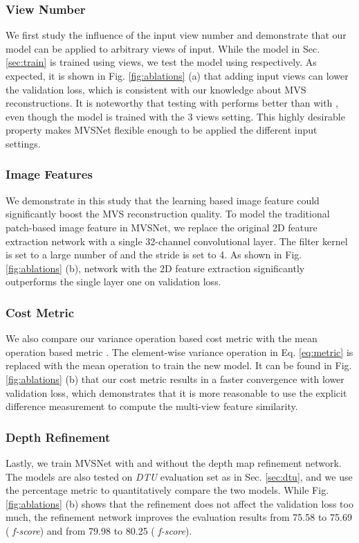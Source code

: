 \documentclass[runningheads]{llncs}
\begin{document}
\subsubsection{View Number}
We first study the influence of the input view number  and demonstrate that our model can be applied to arbitrary views of input. While the model in Sec. \ref{sec:train} is trained using  views, we test the model using  respectively. As expected, it is shown in Fig. \ref{fig:ablations} (a) that adding input views can lower the validation loss, which is consistent with our knowledge about MVS reconstructions. It is noteworthy that testing with  performs better than with , even though the model is trained with the 3 views setting. This highly desirable property makes MVSNet flexible enough to be applied the different input settings.

\vspace{-3mm}
\subsubsection{Image Features}
We demonstrate in this study that the learning based image feature could significantly boost the MVS reconstruction quality. To model the traditional patch-based image feature in MVSNet, we replace the original 2D feature extraction network with a single 32-channel convolutional layer. The filter kernel is set to a large number of  and the stride is set to 4. As shown in Fig. \ref{fig:ablations} (b), network with the 2D feature extraction significantly outperforms the single layer one on validation loss.

\vspace{-3mm}
\subsubsection{Cost Metric}
We also compare our variance operation based cost metric with the mean operation based metric \cite{hartmann2017learned}. The element-wise variance operation in Eq. \ref{eq:metric} is replaced with the mean operation to train the new model. It can be found in Fig. \ref{fig:ablations} (b) that our cost metric results in a faster convergence with lower validation loss, which demonstrates that it is more reasonable to use the explicit difference measurement to compute the multi-view feature similarity.

\vspace{-3mm}
\subsubsection{Depth Refinement} 
Lastly, we train MVSNet with and without the depth map refinement network. The models are also tested on \textit{DTU} evaluation set as in Sec. \ref{sec:dtu}, and we use the percentage metric \cite{knapitsch2017tanks} to quantitatively compare the two models. While Fig. \ref{fig:ablations} (b) shows that the refinement does not affect the validation loss too much, the refinement network improves the evaluation results from 75.58 to 75.69 ( \textit{f-score}) and from 79.98 to 80.25 ( \textit{f-score}). 
\end{document}
